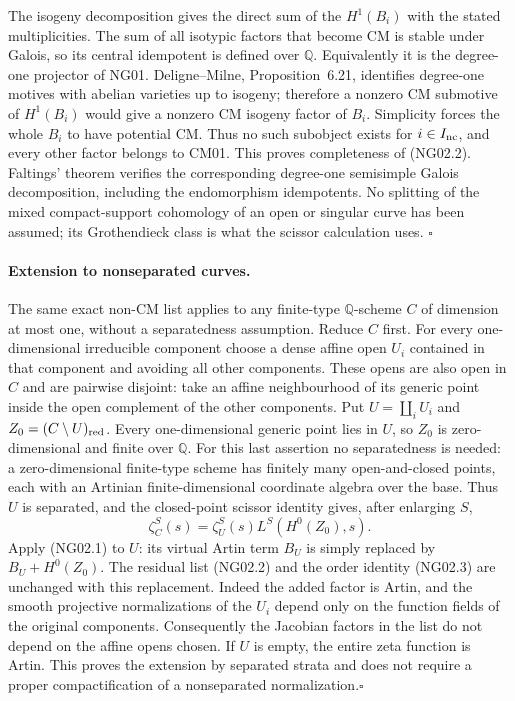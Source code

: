 \documentclass[11pt]{article}
\theoremstyle{remark}
\begin{document}
The isogeny decomposition gives the direct sum of the $H^1(B_i)$ with
the stated multiplicities.  The sum of all isotypic factors that
become CM is stable under Galois, so its central idempotent is defined
over $\mathbb Q$.  Equivalently it is the degree-one projector of NG01.
Deligne--Milne, Proposition~6.21, identifies degree-one motives with
abelian varieties up to isogeny; therefore a nonzero CM submotive of
$H^1(B_i)$ would give a nonzero CM isogeny factor of $B_i$.  Simplicity
forces the whole $B_i$ to have potential CM.  Thus no such subobject
exists for $i\in I_{\rm nc}$, and every other factor belongs to CM01.
This proves completeness of (NG02.2).  Faltings' theorem verifies the
corresponding degree-one semisimple Galois decomposition, including
the endomorphism idempotents.  No splitting of the mixed
compact-support cohomology of an open or singular curve has been
assumed; its Grothendieck class is what the scissor calculation uses.
\hfill$\square$

\paragraph{Extension to nonseparated curves.}
The same exact non-CM list applies to any finite-type
$\mathbb Q$-scheme $C$ of dimension at most one, without a
separatedness assumption.  Reduce $C$ first.  For every
one-dimensional irreducible component choose a dense affine open
$U_i$ contained in that component and avoiding all other components.
These opens are also open in $C$ and are pairwise disjoint: take
an affine neighbourhood of its generic point inside the open
complement of the other components.  Put $U=\coprod_iU_i$ and
$Z_0=(C\setminus U)_{\rm red}$.  Every one-dimensional generic point
lies in $U$, so $Z_0$ is zero-dimensional and finite over $\mathbb Q$.
For this last assertion no separatedness is needed: a zero-dimensional
finite-type scheme has finitely many open-and-closed points, each
with an Artinian finite-dimensional coordinate algebra over the base.
Thus $U$ is separated, and the closed-point scissor identity gives,
after enlarging $S$,
\[
               \zeta_C^S(s)=\zeta_U^S(s)L^S(H^0(Z_0),s).
                                                               \tag{NG02.4}
\]
Apply (NG02.1) to $U$: its virtual Artin term $B_U$ is simply
replaced by $B_U+H^0(Z_0)$.  The residual list (NG02.2) and the
order identity (NG02.3) are unchanged with this replacement.
Indeed the added factor is Artin, and the smooth projective
normalizations of the $U_i$ depend only on the function fields of
the original components.  Consequently the Jacobian factors in
the list do not depend on the affine opens chosen.  If $U$ is empty,
the entire zeta function is Artin.  This proves the extension by
separated strata and does not require a proper compactification
of a nonseparated normalization.\hfill$\square$
\end{document}
